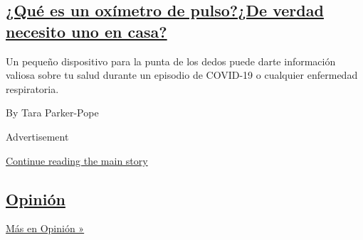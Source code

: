 \begin{enumerate}
  \hypertarget{quuxe9-es-un-oxuxedmetro-de-pulsode-verdad-necesito-uno-en-casa}{%
  \subsection{\texorpdfstring{\href{/es/2020/04/29/espanol/estilos-de-vida/oximetro-para-que-sirve.html}{¿Qué
  es un oxímetro de pulso?¿De verdad necesito uno en
  casa?}}{¿Qué es un oxímetro de pulso?¿De verdad necesito uno en casa?}}\label{quuxe9-es-un-oxuxedmetro-de-pulsode-verdad-necesito-uno-en-casa}}

  Un pequeño dispositivo para la punta de los dedos puede darte
  información valiosa sobre tu salud durante un episodio de COVID-19 o
  cualquier enfermedad respiratoria.

  By Tara Parker-Pope
\end{enumerate}

Advertisement

\protect\hyperlink{after-mid1}{Continue reading the main story}

\hypertarget{opiniuxf3n}{%
\subsection{\texorpdfstring{\href{/es/section/opinion}{Opinión}}{Opinión}}\label{opiniuxf3n}}

\href{/es/section/opinion}{Más en Opinión »}


